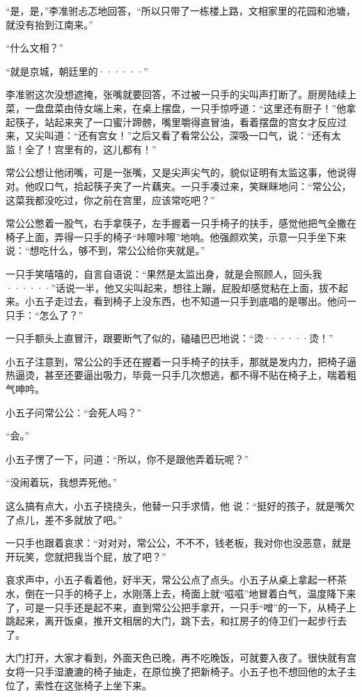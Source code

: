 “是，是，”李准驸忐忑地回答，“所以只带了一栋楼上路，文相家里的花园和池塘，就没有抬到江南来。”

“什么文相？”

“就是京城，朝廷里的······”

李准驸这次没想遮掩，张嘴就要回答，不过被一只手的尖叫声打断了。厨房陆续上菜，一盘盘菜由侍女端上来，在桌上摆盘，一只手惊呼道：“这里还有厨子！”他拿起筷子，站起来夹了一口蜜汁蹄髈，嘴里嚼得直冒油，看着摆盘的宫女才反应过来，又尖叫道：“还有宫女！”之后又看了看常公公，深吸一口气，说：“还有太监！全了！宫里有的，这儿都有！”

常公公想让他闭嘴，可是一张嘴，又是尖声尖气的，貌似证明有太监这事，他说得对。他叹口气，拾起筷子夹了一片藕夹。一只手凑过来，笑眯眯地问：“常公公，这菜我都没吃过，你之前在宫里，应该常吃吧？”

常公公憋着一股气，右手拿筷子，左手握着一只手椅子的扶手，感觉他把气全撒在椅子上面，弄得一只手的椅子“咔嚓咔嚓”地响。他强颜欢笑，示意一只手坐下来说：“想吃什么，够不到，常公公给你夹就是。”

一只手笑嘻嘻的，自言自语说：“果然是太监出身，就是会照顾人，回头我······”话说一半，他又尖叫起来，想往上蹦，屁股却感觉粘在上面，拔不起来。小五子走过去，看到椅子上没东西，也不知道一只手到底唱的是哪出。他问一只手：“怎么了？”

一只手额头上直冒汗，跟要断气了似的，磕磕巴巴地说：“烫······烫！”

小五子注意到，常公公的手还在握着一只手椅子的扶手，那就是发内力，把椅子逼热逼烫，甚至还要逼出吸力，毕竟一只手几次想逃，都不得不贴在椅子上，喘着粗气呻吟。

小五子问常公公：“会死人吗？”

“会。”

小五子愣了一下，问道：“所以，你不是跟他弄着玩呢？”

“没闹着玩，我想弄死他。”

这么搞有点大，小五子挠挠头，他替一只手求情，他
说：“挺好的孩子，就是嘴欠了点儿，差不多就放了吧。”

一只手也跟着哀求：“对对对，常公公，不不不，钱老板，我对你也没恶意，就是开玩笑，您就把我当个屁，放了吧？”

哀求声中，小五子看着他，好半天，常公公点了点头。小五子从桌上拿起一杯茶水，倒在一只手的椅子上，水刚落上去，椅面上就“嗞嗞”地冒着白气，温度降下来了，可是一只手还是起不来，直到常公公把手拿开，一只手“噌”的一下，从椅子上跳起来，离开饭桌，推开文相居的大门，跳下去，和扛房子的侍卫们一起步行去了。

大门打开，大家才看到，外面天色已晚，再不吃晚饭，可就要入夜了。很快就有宫女将一只手湿漉漉的椅子抽走，在原位换了把新椅子。小五子也不想回他的太子主位了，索性在这张椅子上坐下来。

